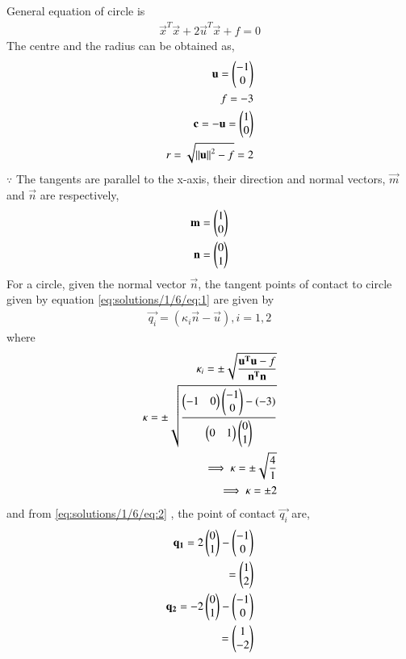 General equation of circle is 
\begin{align}
    \vec{x}^T\vec{x}+ 2\vec{u}^T\vec{x}+f = 0
    \label{eq:solutions/1/6/eq:1}
\end{align}
The centre and the radius can be obtained as,
 \begin{align}
\mathbf{u}=\begin{pmatrix}-1\\0\end{pmatrix}\\
f=-3\\
\mathbf{c}=-\mathbf{u}=\begin{pmatrix}1\\0\end{pmatrix}\\
 r=\sqrt{\left\lVert\mathbf{u}\right\rVert^2-f}=2
 \end{align}
$\because$ The tangents are parallel to the x-axis, their direction and normal vectors, $\vec{m}$ and $\vec{n}$ are respectively,
\begin{align}
\mathbf{m}=\begin{pmatrix}1\\0\end{pmatrix}\\
\mathbf{n}=\begin{pmatrix}0\\1\end{pmatrix}
\end{align}
For a circle, given the normal vector $\vec{n}$, the tangent points of contact to circle given by equation \eqref{eq:solutions/1/6/eq:1}  are given by
\begin{align}
    \vec{q_i}=(\kappa_i \vec{n}-\vec{u}), i=1,2
    \label{eq:solutions/1/6/eq:2}
\end{align}
where
\begin{align}
    \kappa_i=\pm \sqrt{\frac{\mathbf{u^T}\mathbf{u}-f}{\mathbf{n^T}\mathbf{n}}}\\
    \kappa=\pm \sqrt{\frac{\begin{pmatrix}-1 & 0\end{pmatrix}\begin{pmatrix}-1\\0\end{pmatrix}-(-3)}{\begin{pmatrix}0 & 1\end{pmatrix} \begin{pmatrix}0\\1\end{pmatrix}}}\\
 \implies \kappa=\pm \sqrt{\frac{4}{1}}\\
    \implies \kappa=\pm 2      
\end{align}
and from \eqref{eq:solutions/1/6/eq:2} , the point of contact $\vec{q_i}$ are,
\begin{align}
    \mathbf{q_1}=2\begin{pmatrix}0\\1\end{pmatrix}-\begin{pmatrix}-1\\0\end{pmatrix}\\
    =\begin{pmatrix}1\\2\end{pmatrix}\\
    \mathbf{q_2}=-2\begin{pmatrix}0\\1\end{pmatrix}-\begin{pmatrix}-1\\0\end{pmatrix}\\
    =\begin{pmatrix}1\\-2\end{pmatrix}
\end{align}
